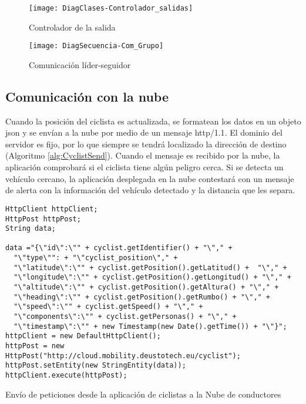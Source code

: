 \begin{figure}[h]
	\begin{center}
		\texttt{[image: DiagClases-Controlador\_salidas]}
		\caption{Controlador de la salida}
		\label{fig:DiagramController}
	\end{center}
\end{figure}

\begin{figure}[h]
	\begin{center}
		\texttt{[image: DiagSecuencia-Com\_Grupo]}
		\caption{Comunicación líder-seguidor}
		\label{fig:groupComm}
	\end{center}
\end{figure}

\subsection{Comunicación con la nube}\label{ssection:comunicacion_nube}
Cuando la posición del ciclista es actualizada, se formatean los datos en un
objeto \gls{json} y se envían a la nube por medio de un mensaje \Gls{http/1.1}.
El dominio del servidor es fijo, por lo que siempre se tendrá localizado la
dirección de destino (Algoritmo \ref{alg:CyclistSend}). Cuando el mensaje es
recibido por la nube, la aplicación comprobará si el ciclista tiene algún
peligro cerca. Si se detecta un vehículo cercano, la aplicación desplegada en
la nube contestará con un mensaje de alerta con la información del vehículo
detectado y la distancia que les separa.

\begin{listing}
	\begin{minipage}{.4\textwidth}
		\begin{verbatim}
HttpClient httpClient;
HttpPost httpPost;
String data;

data ="{\"id\":\"" + cyclist.getIdentifier() + "\"," +
  "\"type\"": + "\"cyclist_position\"," +
  "\"latitude\":\"" + cyclist.getPosition().getLatitud() +  "\"," +
  "\"longitude\":\"" + cyclist.getPosition().getLongitud() + "\"," +
  "\"altitude\":\"" + cyclist.getPosition().getAltura() + "\"," +
  "\"heading\":\"" + cyclist.getPosition().getRumbo() + "\"," +
  "\"speed\":\"" + cyclist.getSpeed() + "\"," +
  "\"components\":\"" + cyclist.getPersonas() + "\"," +
  "\"timestamp\":\"" + new Timestamp(new Date().getTime()) + "\"}";
httpClient = new DefaultHttpClient();
httpPost = new HttpPost("http://cloud.mobility.deustotech.eu/cyclist");
httpPost.setEntity(new StringEntity(data));
httpClient.execute(httpPost);
		\end{verbatim}
	\end{minipage}
	\caption{Envío de peticiones desde la aplicación de ciclistas a la Nube de
	conductores}\label{alg:CyclistSend}
\end{listing}

